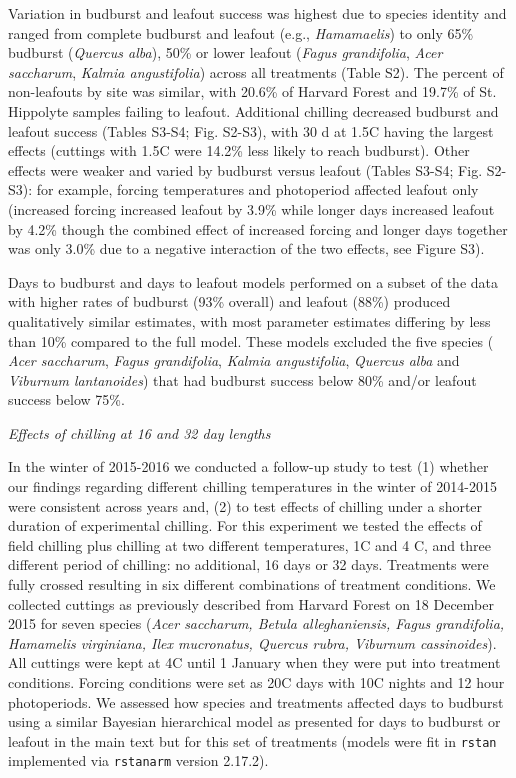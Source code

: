 \documentclass{article}
\begin{document}
Variation in budburst and leafout success was highest due to species identity and ranged from complete budburst and leafout (e.g., \emph{Hamamaelis}) to only 65\% budburst (\emph{Quercus alba}), 50\% or lower leafout (\emph{Fagus grandifolia}, \emph{Acer saccharum}, \emph{Kalmia angustifolia}) across all treatments (Table S2). The percent of non-leafouts by site was similar, with 20.6\% of Harvard Forest and 19.7\% of St. Hippolyte samples failing to leafout. Additional chilling decreased budburst and leafout success (Tables S3-S4; Fig. S2-S3), with 30 d at 1.5\degree C having the largest effects (cuttings with 1.5\degree C were 14.2\% less likely to reach budburst). Other effects were weaker and varied by budburst versus leafout (Tables S3-S4; Fig. S2-S3): for example, forcing temperatures and photoperiod affected leafout only (increased forcing increased leafout by 3.9\% while longer days increased leafout by 4.2\% though the combined effect of increased forcing and longer days together was only 3.0\% due to a negative interaction of the two effects, see Figure S3).

Days to budburst and days to leafout models performed on a subset of the data with higher rates of budburst (93\% overall) and leafout (88\%) produced qualitatively similar estimates, with most parameter estimates differing by less than 10\% compared to the full model. These models excluded the five species ( \emph{Acer saccharum}, \emph{Fagus grandifolia}, \emph{Kalmia angustifolia}, \emph{Quercus alba} and \emph{Viburnum lantanoides}) that had budburst success below 80\% and/or leafout success below 75\%.

\noindent\emph{Effects of chilling at 16 and 32 day lengths}

\noindent In the winter of 2015-2016 we conducted a follow-up study to test (1) whether our findings regarding different chilling temperatures in the winter of 2014-2015 were consistent across years and, (2) to test effects of chilling under a shorter duration of experimental chilling. For this experiment we tested the effects of field chilling plus chilling at two different temperatures, 1\degree C and 4 \degree C, and three different period of chilling: no additional, 16 days or 32 days. Treatments were fully crossed resulting in six different combinations of treatment conditions. We collected cuttings as previously described from Harvard Forest on 18 December 2015 for seven species (\emph{Acer saccharum, Betula alleghaniensis, Fagus grandifolia, Hamamelis virginiana, Ilex mucronatus, Quercus rubra, Viburnum cassinoides}). All cuttings were kept at 4\degree C until 1 January when they were put into treatment conditions. Forcing conditions were set as 20\degree C days with 10\degree C nights and 12 hour photoperiods. We assessed how species and treatments affected days to budburst using a similar Bayesian hierarchical model as presented for days to budburst or leafout in the main text but for this set of treatments (models were fit in \verb|rstan| implemented via  \verb|rstanarm| version 2.17.2). 
\end{document}
